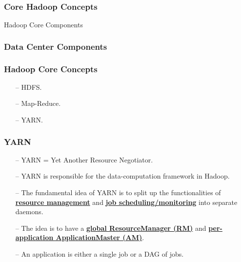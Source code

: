 \begin{frame}[c]{ }
	\frametitle{Core Hadoop Concepts }
	\centering     
	
	\textcolor{offgreen}{ \large Hadoop Core Components}
\end{frame}
\begin{frame}[c]{ }
	\frametitle{Data Center Components }
	\begin{figure}
		\centering
		
	\end{figure}
\end{frame}
\begin{frame}[c]{ }
	\frametitle{Hadoop Core Concepts }
	
	
	\begin{itemize}  [<+->]
		\item [--] HDFS.
		\item [--] Map-Reduce.
		\item [--] YARN.
		
	\end{itemize}
\end{frame}
\begin{frame}[c]{ }
	\frametitle{YARN }
	
	\begin{itemize}  [<+->]
		\item [--] YARN =  Yet Another Resource Negotiator.
		\item [--] YARN is responsible for the data-computation framework in Hadoop.
		\item [--] The fundamental idea of YARN is to split up the functionalities of 	\textcolor{offyellow}{ \underline{ \textbf{resource management}}} and 	\textcolor{offyellow}{ \underline{ \textbf{job scheduling/monitoring}}} into separate daemons.
		\item [--] The idea is to have a \textcolor{offyellow}{ \underline{ \textbf{global ResourceManager (RM)}}} and 	\textcolor{offyellow}{ \underline{ \textbf{per-application ApplicationMaster (AM)}}}. 
		\item [--] An application is either a single job or a DAG of jobs.		
	\end{itemize}
\end{frame}
